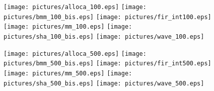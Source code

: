 %


\begin{figure}
  \begin{center}
    \texttt{[image: pictures/alloca\_100.eps]}
    \texttt{[image: pictures/bmm\_100\_bis.eps]}
    \texttt{[image: pictures/fir\_int100.eps]}
    \texttt{[image: pictures/mm\_100.eps]}
    \texttt{[image: pictures/sha\_100\_bis.eps]}
    \texttt{[image: pictures/wave\_100.eps]} 
  \end{center}
\end{figure}

\begin{figure}
  \begin{center}
    \texttt{[image: pictures/alloca\_500.eps]}
    \texttt{[image: pictures/bmm\_500\_bis.eps]}
    \texttt{[image: pictures/fir\_int500.eps]}
    \texttt{[image: pictures/mm\_500.eps]}
    \texttt{[image: pictures/sha\_500\_bis.eps]}
    \texttt{[image: pictures/wave\_500.eps]} 
  \end{center}
\end{figure}

